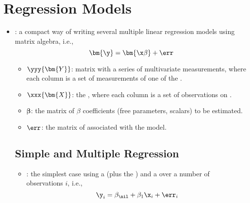 \section{Regression Models}
\begin{itemize}
  \item {}: a compact way of writing several multiple linear regression models using matrix algebra, i.e.,
  \[%
  \bm{\y} = \bm{\x\beta} + \err
  \]%
  \begin{itemize}
    \item \(\yyy{\bm{Y}}\): matrix with a series of multivariate measurements, where each column is a set of measurements of one of the .
    \item \(\xxx{\bm{X}}\): the , where each column is a set of observations on .
    \item \(\bm{\beta}\): the matrix of \(\beta \) coefficients (free parameters, scalars) to be estimated.
    \item \(\displaystyle\err\): the matrix of  associated with the model.
  \end{itemize}
  
  \subsection{Simple and Multiple Regression}
  \begin{itemize}
    \item {}: the simplest case using a  (plus the \hyperref[Subsection: Model-Fitting]{}) and a  over a number of observations \(i\), i.e.,
    \[%
    \y_i = \beta_\nil + \beta_1\x_i + \err_i
    \]%
    

\end{itemize}
\end{itemize}
